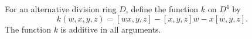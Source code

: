 For an alternative division ring $D$, define the function $k$ on $D^4$ by
$$k(w, x, y, z) = [wx, y, z] - [x, y, z] w - x[w, y, z].$$
The function $k$ is additive in all arguments.
